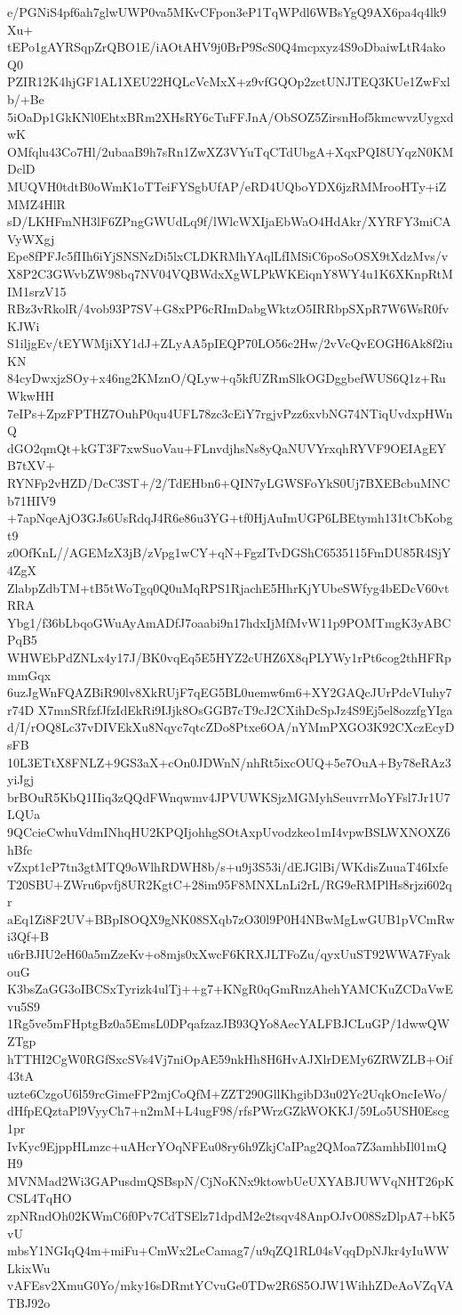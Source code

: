 e/PGNiS4pf6ah7glwUWP0va5MKvCFpon3eP1TqWPdl6WBsYgQ9AX6pa4q4lk9Xu+
tEPo1gAYRSqpZrQBO1E/iAOtAHV9j0BrP9ScS0Q4mcpxyz4S9oDbaiwLtR4akoQ0
PZIR12K4hjGF1AL1XEU22HQLcVcMxX+z9vfGQOp2zctUNJTEQ3KUe1ZwFxlb/+Be
5iOaDp1GkKNl0EhtxBRm2XHsRY6cTuFFJnA/ObSOZ5ZirsnHof5kmcwvzUygxdwK
OMfqlu43Co7Hl/2ubaaB9h7sRn1ZwXZ3VYuTqCTdUbgA+XqxPQI8UYqzN0KMDclD
MUQVH0tdtB0oWmK1oTTeiFYSgbUfAP/eRD4UQboYDX6jzRMMrooHTy+iZMMZ4HlR
sD/LKHFmNH3lF6ZPngGWUdLq9f/lWlcWXIjaEbWaO4HdAkr/XYRFY3miCAVyWXgj
Epe8fPFJc5fIIh6iYjSNSNzDi5lxCLDKRMhYAqlLfIMSiC6poSoOSX9tXdzMvs/v
X8P2C3GWvbZW98bq7NV04VQBWdxXgWLPkWKEiqnY8WY4u1K6XKnpRtMIM1srzV15
RBz3vRkolR/4vob93P7SV+G8xPP6cRImDabgWktzO5IRRbpSXpR7W6WsR0fvKJWi
S1iljgEv/tEYWMjiXY1dJ+ZLyAA5pIEQP70LO56c2Hw/2vVcQvEOGH6Ak8f2iuKN
84cyDwxjzSOy+x46ng2KMznO/QLyw+q5kfUZRmSlkOGDggbefWUS6Q1z+RuWkwHH
7eIPs+ZpzFPTHZ7OuhP0qu4UFL78zc3cEiY7rgjvPzz6xvbNG74NTiqUvdxpHWnQ
dGO2qmQt+kGT3F7xwSuoVau+FLnvdjhsNs8yQaNUVYrxqhRYVF9OEIAgEYB7tXV+
RYNFp2vHZD/DcC3ST+/2/TdEHbn6+QIN7yLGWSFoYkS0Uj7BXEBcbuMNCb71HIV9
+7apNqeAjO3GJs6UsRdqJ4R6e86u3YG+tf0HjAuImUGP6LBEtymh131tCbKobgt9
z0OfKnL//AGEMzX3jB/zVpg1wCY+qN+FgzITvDGShC6535115FmDU85R4SjY4ZgX
ZlabpZdbTM+tB5tWoTgq0Q0uMqRPS1RjachE5HhrKjYUbeSWfyg4bEDcV60vtRRA
Ybg1/f36bLbqoGWuAyAmADfJ7oaabi9n17hdxIjMfMvW11p9POMTmgK3yABCPqB5
WHWEbPdZNLx4y17J/BK0vqEq5E5HYZ2cUHZ6X8qPLYWy1rPt6cog2thHFRpmmGqx
6uzJgWnFQAZBiR90lv8XkRUjF7qEG5BL0uemw6m6+XY2GAQcJUrPdcVIuhy7r74D
X7mnSRfzfJfzIdEkRi9IJjk8OsGGB7cT9cJ2CXihDcSpJz4S9Ej5el8ozzfgYIga
d/I/rOQ8Lc37vDIVEkXu8Nqyc7qtcZDo8Ptxe6OA/nYMmPXGO3K92CXczEcyDsFB
10L3ETtX8FNLZ+9GS3aX+cOn0JDWnN/nhRt5ixcOUQ+5e7OuA+By78eRAz3yiJgj
brBOuR5KbQ1IIiq3zQQdFWnqwmv4JPVUWKSjzMGMyhSeuvrrMoYFsl7Jr1U7LQUa
9QCcieCwhuVdmINhqHU2KPQIjohhgSOtAxpUvodzkeo1mI4vpwBSLWXNOXZ6hBfc
vZxpt1cP7tn3gtMTQ9oWlhRDWH8b/s+u9j3S53i/dEJGlBi/WKdisZuuaT46Ixfe
T20SBU+ZWru6pvfj8UR2KgtC+28im95F8MNXLnLi2rL/RG9eRMPlHs8rjzi602qr
aEq1Zi8F2UV+BBpI8OQX9gNK08SXqb7zO30l9P0H4NBwMgLwGUB1pVCmRwi3Qf+B
u6rBJIU2eH60a5mZzeKv+o8mjs0xXwcF6KRXJLTFoZu/qyxUuST92WWA7FyakouG
K3bsZaGG3oIBCSxTyrizk4ulTj++g7+KNgR0qGmRnzAhehYAMCKuZCDaVwEvu5S9
1Rg5ve5mFHptgBz0a5EmsL0DPqafzazJB93QYo8AecYALFBJCLuGP/1dwwQWZTgp
hTTHI2CgW0RGfSxcSVs4Vj7niOpAE59nkHh8H6HvAJXlrDEMy6ZRWZLB+Oif43tA
uzte6CzgoU6l59rcGimeFP2mjCoQfM+ZZT290GllKhgibD3u02Yc2UqkOncIeWo/
dHfpEQztaPl9VyyCh7+n2mM+L4ugF98/rfsPWrzGZkWOKKJ/59Lo5USH0Escg1pr
IvKyc9EjppHLmzc+uAHcrYOqNFEu08ry6h9ZkjCaIPag2QMoa7Z3amhbIl01mQH9
MVNMad2Wi3GAPusdmQSBspN/CjNoKNx9ktowbUeUXYABJUWVqNHT26pKCSL4TqHO
zpNRndOh02KWmC6f0Pv7CdTSElz71dpdM2e2tsqv48AnpOJvO08SzDlpA7+bK5vU
mbsY1NGIqQ4m+miFu+CmWx2LeCamag7/u9qZQ1RL04sVqqDpNJkr4yIuWWLkixWu
vAFEsv2XmuG0Yo/mky16sDRmtYCvuGe0TDw2R6S5OJW1WihhZDeAoVZqVATBJ92o
